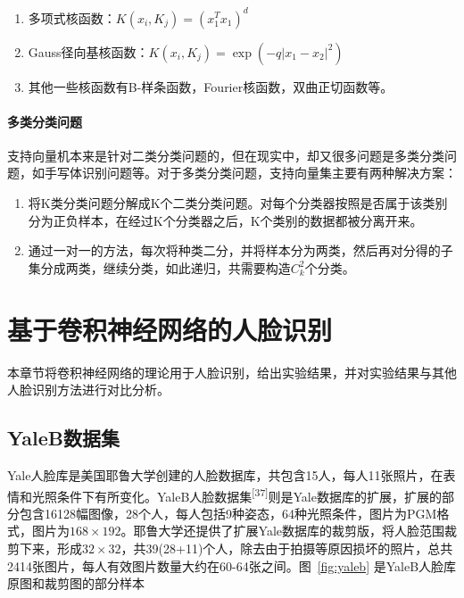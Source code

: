 \documentclass[bachelor,zhspacing]{cqu}  %
\def\tightlist{}
\begin{document}
\begin{enumerate}
\def\labelenumi{\arabic{enumi}.}
\tightlist
\item
  多项式核函数：\(K(x_{i},K_{j})=(x_{1}^{T}x_{1})^{d}\)
\item
  Gauss径向基核函数：\(K(x_{i},K_{j})=\exp(-q\lvert x_{1}-x_{2}\rvert^{2})\)
\item
  其他一些核函数有B-样条函数，Fourier核函数，双曲正切函数等。
\end{enumerate}

\paragraph{多类分类问题}\label{ux591aux7c7bux5206ux7c7bux95eeux9898}

支持向量机本来是针对二类分类问题的，但在现实中，却又很多问题是多类分类问题，如手写体识别问题等。对于多类分类问题，支持向量集主要有两种解决方案：

\begin{enumerate}
\def\labelenumi{\arabic{enumi}.}
\tightlist
\item
  将K类分类问题分解成K个二类分类问题。对每个分类器按照是否属于该类别分为正负样本，在经过K个分类器之后，K个类别的数据都被分离开来。
\item
  通过一对一的方法，每次将种类二分，并将样本分为两类，然后再对分得的子集分成两类，继续分类，如此递归，共需要构造\(C_{k}^{2}\)个分类。
\end{enumerate}

\section{基于卷积神经网络的人脸识别}\label{ux57faux4e8eux5377ux79efux795eux7ecfux7f51ux7edcux7684ux4ebaux8138ux8bc6ux522b}

本章节将卷积神经网络的理论用于人脸识别，给出实验结果，并对实验结果与其他人脸识别方法进行对比分析。

\subsection{YaleB数据集}\label{yalebux6570ux636eux96c6}

Yale人脸库是美国耶鲁大学创建的人脸数据库，共包含15人，每人11张照片，在表情和光照条件下有所变化。YaleB人脸数据集\textsuperscript{{[}37{]}}则是Yale数据库的扩展，扩展的部分包含16128幅图像，28个人，每人包括9种姿态，64种光照条件，图片为PGM格式，图片为\(168\times 192\)。耶鲁大学还提供了扩展Yale数据库的裁剪版，将人脸范围裁剪下来，形成\(32\times 32\)，共39(28+11)个人，除去由于拍摄等原因损坏的照片，总共2414张图片，每人有效图片数量大约在60-64张之间。图~\ref{fig:yaleb}
是YaleB人脸库原图和裁剪图的部分样本
\end{document}
